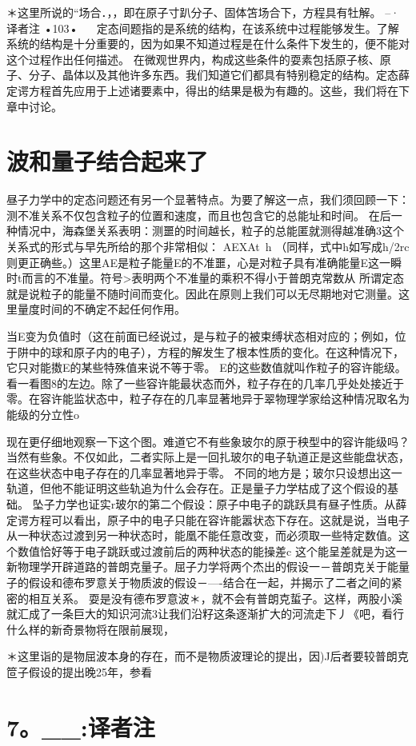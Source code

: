 ＊这里所说的“场合．，，即在原子寸趴分子、固体笘场合下，方程具有牡解。
--·译者注
•103•
  
定态间题指的是系统的结构，在该系统中过程能够发生。了解系统的结构是十分重要的，因为如果不知道过程是在什么条件下发生的，便不能对这个过程作出任何描述。
在微观世界内，构成这些条件的耍素包括原子核、原子、分子、晶体以及其他许多东西。我们知道它们都具有特别稳定的结构。定态薛定谔方程首先应用于上述诸要素中，得出的结果是极为有趣的。这些，我们将在下章中讨论。

\section{波和量子结合起来了}

昼子力学中的定态问题还有另一个显著特点。为要了解这一点，我们须回顾一下：测不准关系不仅包含粒子的位置和速度，而且也包含它的总能址和时间。
在后一种情况中，海森堡关系表明：测噩的时间越长，粒子的总能匿就测得越准确3这个关系式的形式与早先所给的那个非常相似：
AEXAt~h
（同样，式中h如写成h/2rc则更正确些。）这里AE是粒子能量E的不准噩，心是对粒子具有准确能量E这一瞬时t而言的不准量。符号>表明两个不准量的乘积不得小于普朗克常数从
所谓定态就是说粒子的能量不随时间而变化。因此在原则上我们可以无尽期地对它测量。这里量度时间的不确定不起任何作用。

当E变为负值时（这在前面已经说过，是与粒子的被束缚状态相对应的；例如，位于阱中的球和原子内的电子），方程的解发生了根本性质的变化。在这种情况下，它只对能擞E的某些特殊值来说不等于零。
E的这些数值就叫作粒子的容许能级。看一看图8的左边。除了一些容许能最状态而外，粒子存在的几率几乎处处接近于零。在容许能监状态中，粒子存在的几率显著地异于翠物理学家给这种情况取名为能级的分立性o

现在更仔细地观察一下这个图。难道它不有些象玻尔的原于秧型中的容许能级吗？当然有些象。不仅如此，二者实际上是一回扎玻尔的电子轨道正是这些能盘状态，在这些状态中电子存在的几率显著地异于零。
不同的地方是；玻尔只设想出这一轨道，但他不能证明这些轨追为什么会存在。正是量子力学枯成了这个假设的基础。
坠子力学也证实r玻尔的第二个假设：原子中电子的跳跃具有昼子性质。从薛定谔方程可以看出，原子中的电子只能在容许能嚣状态下存在。这就是说，当电子从一种状态过渡到另一种状态时，能凰不能任意改变，而必须取一些特定数值。这个数值恰好等于电子跳跃或过渡前后的两种状态的能操差c
这个能呈差就是为这一新物理学开辟道路的普朗克量子。屈子力学将两个杰出的假设一－普朗克关于能量子的假设和德布罗意关于物质波的假设－—-结合在一起，并揭示了二者之间的紧密的相互关系。
耍是没有德布罗意波＊，就不会有普朗克蜇子。这样，两股小溪就汇成了一条巨大的知识河流3让我们沿籽这条逐渐扩大的河流走下丿《吧，看行什么样的新奇景物将在限前展现，

＊这里诣的是物屈波本身的存在，而不是物质波理论的提出，因)J后者要较普朗克笸子假设的提出晚25年，参看\section{7。__:译者注}
